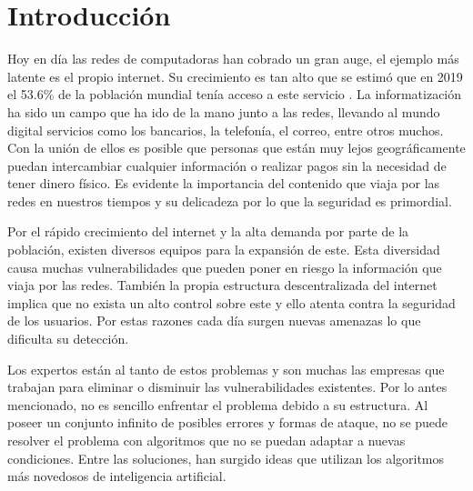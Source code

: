 \chapter*{Introducción}\label{chapter:introduction}




Hoy en día las redes de computadoras han cobrado un gran auge, el ejemplo más latente es el propio internet. Su crecimiento es tan alto que se estimó que en 2019 el 53.6\% de la población mundial tenía acceso a este servicio \cite{internetAcces}. La informatización ha sido un campo que ha ido de la mano junto a las redes, llevando al mundo digital servicios como los bancarios, la telefonía, el correo, entre otros muchos. Con la unión de ellos es posible que personas que están muy lejos geográficamente puedan intercambiar cualquier información o realizar pagos sin la necesidad de tener dinero físico. Es evidente la importancia del contenido que viaja por las redes en nuestros tiempos y su delicadeza por lo que la seguridad es primordial.

Por el rápido crecimiento del internet y la alta demanda por parte de la población, existen diversos equipos para la expansión de este. Esta diversidad causa muchas vulnerabilidades que pueden poner en riesgo la información que viaja por las redes. También la propia estructura descentralizada del internet implica que no exista un alto control sobre este y ello atenta contra la seguridad de los usuarios. Por estas razones cada día surgen nuevas amenazas lo que dificulta su detección.

Los expertos están al tanto de estos problemas y son muchas las empresas que trabajan para eliminar o disminuir las vulnerabilidades existentes. Por lo antes mencionado, no es sencillo enfrentar el problema debido a su estructura. Al poseer un conjunto infinito de posibles errores y formas de ataque, no se puede resolver el problema con algoritmos que no se puedan adaptar a nuevas condiciones. Entre las soluciones, han surgido ideas que utilizan los algoritmos más novedosos de inteligencia artificial.

